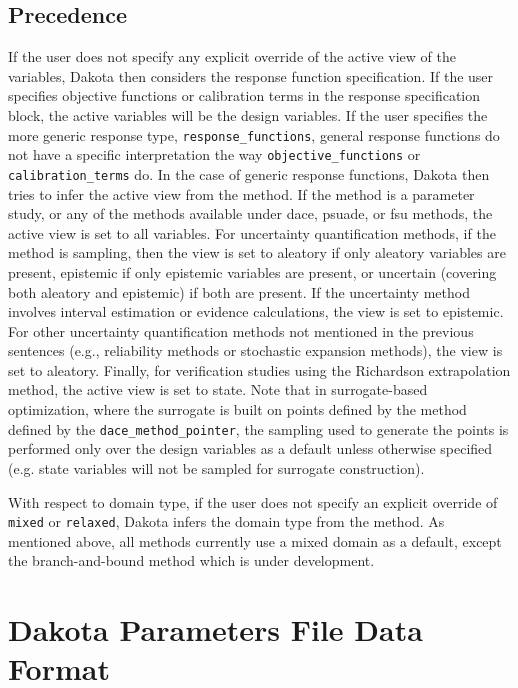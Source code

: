\subsection{Precedence}\label{variables:precedence}
If the user does not specify any explicit override of the active view 
of the variables, Dakota then considers the response function 
specification.  If the user specifies objective functions or calibration 
terms in the response specification block, the active variables will 
be the design variables.  If the user specifies the more generic 
response type, \texttt{response\_functions}, general response 
functions do not have a specific interpretation the way 
\texttt{objective\_functions} or \texttt{calibration\_terms} do. 
In the case of generic response functions, Dakota then tries to 
infer the active view from the method.  If the method is a parameter 
study, or any of the methods available under dace, psuade, or fsu methods, 
the active view is set to all variables.  For uncertainty quantification 
methods, if the method is sampling, 
then the view is set to aleatory if only aleatory variables are present, 
epistemic if only epistemic variables are present, or uncertain (covering
both aleatory and epistemic) if both are present.  If the uncertainty method 
involves interval estimation or evidence calculations, the view is set 
to epistemic. For other uncertainty quantification methods not mentioned 
in the previous sentences (e.g., reliability methods or stochastic 
expansion methods), the view is set to aleatory. 
Finally, for verification studies using the Richardson extrapolation 
method, the active view is set to state.   
Note that in surrogate-based optimization, where the surrogate 
is built on points defined by the method defined by the 
\texttt{dace\_method\_pointer}, the sampling used to generate the points 
is performed only over the design variables as a default unless 
otherwise specified (e.g. state variables will not be sampled 
for surrogate construction). 

With respect to domain type, if the user does not specify an 
explicit override of \texttt{mixed} or \texttt{relaxed}, Dakota infers
the domain type from the method.  As mentioned above, 
all methods currently use a mixed domain as a default, except 
the branch-and-bound method which is under development.
  
\section{Dakota Parameters File Data Format}\label{variables:parameters}

